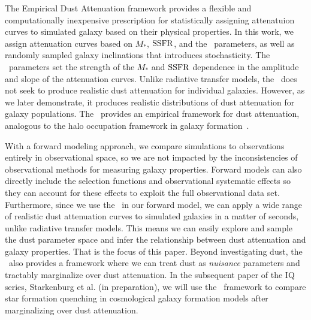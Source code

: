 The Empirical Dust Attenuation framework provides a flexible and
computationally inexpensive prescription for statistically assigning
attenatuion curves to simulated galaxy based on their physical properties. 
In this work, we assign attenuation curves based on $M_*$, ${\rm SSFR}$, and the
\eda~parameters, as well as randomly sampled galaxy inclinations that
introduces stochasticity.  
The \eda~parameters set the strength of the $M_*$ and ${\rm SSFR}$ dependence in the
amplitude and slope of the attenuation curves. 
Unlike radiative transfer models, the \eda~does not seek to produce realistic
dust attenuation for individual galaxies. 
However, as we later demonstrate, it produces realistic distributions of dust
attenuation for galaxy populations. 
The \eda~provides an empirical framework for dust attenuation, analogous to the
halo occupation framework in galaxy formation~\citep[for a review see ][]{wechsler2018}. 

With a forward modeling approach, we compare simulations to  observations
entirely in observational space, so we are not impacted by
the inconsistencies of observational methods for measuring galaxy properties. 
Forward models can also directly include the selection functions and
observational systematic effects so they can account for these effects to
exploit the full observational data set.
Furthermore, since we use the \eda~in our forward model, we can apply a
wide range of realistic dust attenuation curves to simulated galaxies in a
matter of seconds, unlike radiative transfer models.
This means we can easily explore and sample the dust parameter space and infer
the relationship between dust attenuation and galaxy properties. 
That is the focus of this paper. 
Beyond investigating dust, the \eda~also provides a framework where we can
treat dust as {\em nuisance} parameters and tractably marginalize over dust
attenuation. 
In the subsequent paper of the IQ series, Starkenburg et al. (in
preparation), we will use the \eda~framework to compare star formation
quenching in cosmological galaxy formation models after marginalizing over
dust attenuation. 

